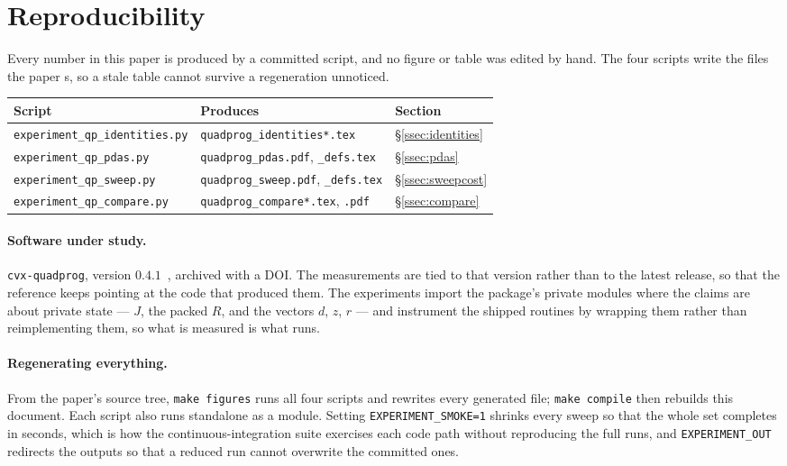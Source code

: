 \section*{Reproducibility}

Every number in this paper is produced by a committed script, and no figure or
table was edited by hand. The four scripts write the files the paper
\verb||s, so a stale table cannot survive a regeneration unnoticed.

\begin{center}
\small
\begin{tabular}{lll}
\toprule
Script & Produces & Section \\
\midrule
\verb|experiment_qp_identities.py| & \verb|quadprog_identities*.tex|
  & \S\ref{ssec:identities} \\
\verb|experiment_qp_pdas.py| & \verb|quadprog_pdas.pdf|, \verb|_defs.tex|
  & \S\ref{ssec:pdas} \\
\verb|experiment_qp_sweep.py| & \verb|quadprog_sweep.pdf|, \verb|_defs.tex|
  & \S\ref{ssec:sweepcost} \\
\verb|experiment_qp_compare.py| & \verb|quadprog_compare*.tex|, \verb|.pdf|
  & \S\ref{ssec:compare} \\
\bottomrule
\end{tabular}
\end{center}

\paragraph{Software under study.} \texttt{cvx-quadprog}, version
$0.4.1$~\cite{cvxquadprog}, archived with a DOI. The measurements are tied to that
version rather than to the latest release, so that the reference keeps pointing at
the code that produced them. The experiments import the package's private modules
where the claims are about private state --- $J$, the packed $R$, and the vectors
$d$, $z$, $r$ --- and instrument the shipped routines by wrapping them rather than
reimplementing them, so what is measured is what runs.

\paragraph{Regenerating everything.} From the paper's source tree, \verb|make figures|
runs all four scripts and rewrites every generated file; \verb|make compile| then
rebuilds this document. Each script also runs standalone as a module. Setting
\verb|EXPERIMENT_SMOKE=1| shrinks every sweep so that the whole set completes in
seconds, which is how the continuous-integration suite exercises each code path
without reproducing the full runs, and \verb|EXPERIMENT_OUT| redirects the outputs
so that a reduced run cannot overwrite the committed ones.

